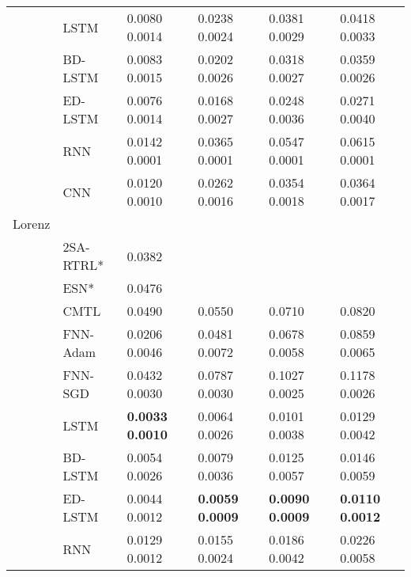 \documentclass{ieeeaccess}
\begin{document}
\begin{table*}[htbp!]
\begin{tabular}{llllll}
&LSTM   &   0.0080	0.0014   	&    0.0238	0.0024    &0.0381	0.0029	       &0.0418	0.0033\\

&BD-LSTM   &   0.0083	0.0015   	&   0.0202	0.0026     &0.0318	0.0027	       &0.0359	0.0026\\

&ED-LSTM   &   0.0076	0.0014   	&    0.0168	0.0027    &	0.0248	0.0036       &0.0271	0.0040\\

&RNN  &    0.0142	0.0001  	&   0.0365	0.0001     &0.0547	0.0001	       &0.0615	0.0001\\

&CNN &     0.0120		0.0010 	&   0.0262		0.0016     &0.0354		0.0018	       &0.0364		0.0017\\

\hline





Lorenz &    	   &	& \\
 


 &2SA-RTRL*\cite{chang2012reinforced}  &  0.0382	   &	 &  \\



 &ESN*\cite{chang2012reinforced}&    0.0476 	   &	&   \\
 
 &CMTL \cite{chandra2017CMTLMulti} & 0.0490	 &  0.0550	&0.0710 & 0.0820  \\
&FNN-Adam &    0.0206	0.0046  	&  0.0481	0.0072      & 0.0678	0.0058	       &0.0859	0.0065\\

&FNN-SGD  & 0.0432	0.0030     	&   0.0787	0.0030     &0.1027	0.0025	       &0.1178	0.0026\\

&LSTM   & \textbf{0.0033	0.0010}     	&  0.0064	0.0026      &	0.0101	0.0038       &0.0129	0.0042\\

&BD-LSTM   & 0.0054	0.0026     	&  0.0079	0.0036      &0.0125	0.0057	       &0.0146	0.0059\\

&ED-LSTM   &0.0044	0.0012      	&  \textbf{0.0059	0.0009}      &\textbf{0.0090	0.0009}	       &\textbf{0.0110	0.0012}\\

&RNN  &   0.0129	0.0012   	& 0.0155	0.0024       &0.0186	0.0042	       &0.0226	0.0058\\


\end{tabular}
\end{table*}
\end{document}
